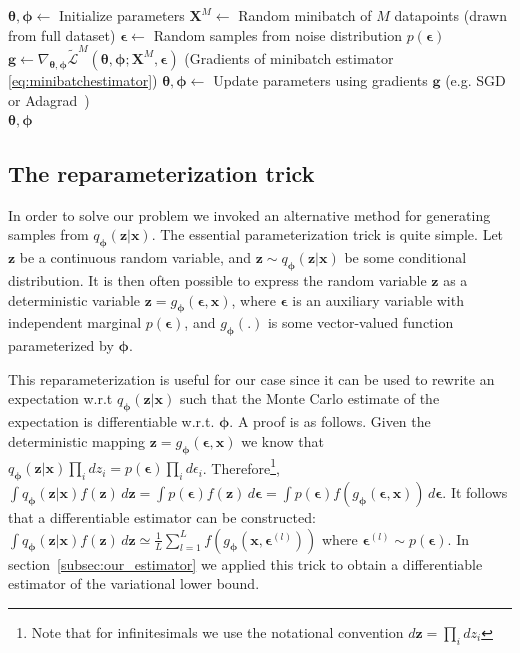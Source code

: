 \documentclass{article} %
\theoremstyle{definition}
\newcommand{\bb}[1]{\mathbf{#1}}
\newcommand{\bx}{\bb{x}}
\newcommand{\bg}{\bb{g}}
\newcommand{\bz}{\bb{z}}
\newcommand{\bT}{\boldsymbol{\theta}}
\newcommand{\bphi}{\boldsymbol{\phi}}
\newcommand{\beps}{\boldsymbol{\epsilon}}
\newcommand{\bepsl}{\beps^{(l)}}
\newcommand{\bX}{\bb{X}}
\newcommand{\qPhi}{q_{\bphi}}
\newcommand{\gPhi}{g_{\bphi}}
\theoremstyle{definition}
\newcommand{\LBT}[2]{\widetilde{\mathcal{L}}^{#1}(\bT,\bphi; #2)}
\begin{document}
\begin{algorithm}[t]
\caption{Minibatch version of the Auto-Encoding VB (AEVB) algorithm. Either of the two SGVB estimators in section~\ref{subsec:our_estimator} can be used. We use settings $M=100$ and $L=1$ in experiments. }
\renewcommand{\algorithmicforall}{\textbf{for each}}
\begin{algorithmic}
\State $\bT, \bphi \gets$ Initialize parameters
\Repeat
\State $\bX^M \gets $ Random minibatch of $M$ datapoints (drawn from full dataset)
\State $\beps \gets $ Random samples from noise distribution $p(\beps)$
\State $\bg \gets \nabla_{\bT,\bphi} \LBT{M}{\bX^M,\beps}$ (Gradients of minibatch estimator \eqref{eq:minibatchestimator})
\State $\bT, \bphi \gets $ Update parameters using gradients $\bg$ (e.g. SGD or Adagrad~\cite{duchi2010adaptive})
\Until {convergence of parameters $(\bT,\bphi)$}
\\ \Return $\bT, \bphi$
\end{algorithmic}
\label{algorithm}
\end{algorithm}

\subsection{The reparameterization trick}
\label{subsec:thetrick}

%
%
%
%

%

In order to solve our problem we invoked an alternative method for generating samples from $\qPhi(\bz|\bx)$. The essential parameterization trick is quite simple. Let $\bz$ be a continuous random variable, and $\bz \sim \qPhi(\bz|\bx)$ be some conditional distribution. It is then often possible to express the random variable $\bz$ as a deterministic variable $\bz = \gPhi(\beps, \bx)$, where $\beps$ is an auxiliary variable with independent marginal $p(\beps)$, and $\gPhi(.)$ is some vector-valued function parameterized by $\bphi$.
%

This reparameterization is useful for our case since it can be used to rewrite an expectation w.r.t $\qPhi(\bz|\bx)$ such that the Monte Carlo estimate of the expectation is differentiable w.r.t. $\bphi$. A proof is as follows. Given the deterministic mapping $\bz = \gPhi(\beps, \bx)$ we know that $\qPhi(\bz|\bx) \prod_i d z_i = p(\beps) \prod_i d \epsilon_i$. Therefore\footnote{Note that for infinitesimals we use the notational convention $d\bz = \prod_i d z_i$}, $\int \qPhi(\bz|\bx) f(\bz) \,d\bz = \int p(\beps) f(\bz) \,d\beps = \int p(\beps) f(\gPhi(\beps, \bx)) \,d\beps$. It follows that a differentiable estimator can be constructed: $\int \qPhi(\bz|\bx) f(\bz) \,d\bz \simeq \frac{1}{L} \sum_{l=1}^L f(\gPhi(\bx, \bepsl))$ where $\bepsl \sim p(\beps)$. In section~\ref{subsec:our_estimator} we applied this trick to obtain a differentiable estimator of the variational lower bound.
\end{document}
